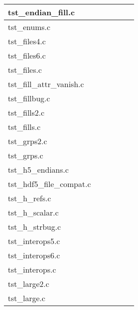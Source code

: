 \begin{table}[H]
\begin{tabular}{|l|c|c|c|c|c|}
tst\_endian\_fill.c   &   &   &   &   &   \\ \hline
tst\_enums.c   &   &   &   &   &   \\ \hline
tst\_files4.c   &   &   &   &   &   \\ \hline
tst\_files6.c   &   &   &   &   &   \\ \hline
tst\_files.c   &   &   &   &   &   \\ \hline
tst\_fill\_attr\_vanish.c   &   &   &   &   &   \\ \hline
tst\_fillbug.c   &   &   &   &   &   \\ \hline
tst\_fills2.c   &   &   &   &   &   \\ \hline
tst\_fills.c   &   &   &   &   &   \\ \hline
tst\_grps2.c   &   &   &   &   &   \\ \hline
tst\_grps.c   &   &   &   &   &   \\ \hline
tst\_h5\_endians.c   &   &   &   &   &   \\ \hline
tst\_hdf5\_file\_compat.c   &   &   &   &   &   \\ \hline
tst\_h\_refs.c   &   &   &   &   &   \\ \hline
tst\_h\_scalar.c   &   &   &   &   &   \\ \hline
tst\_h\_strbug.c   &   &   &   &   &   \\ \hline
tst\_interops5.c   &   &   &   &   &   \\ \hline
tst\_interops6.c   &   &   &   &   &   \\ \hline
tst\_interops.c   &   &   &   &   &   \\ \hline
tst\_large2.c   &   &   &   &   &   \\ \hline
tst\_large.c   &   &   &   &   &   \\ \hline
\end{tabular}
\caption{}
\end{table}

\clearpage

